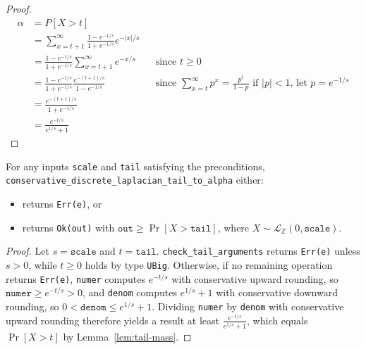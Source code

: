 \documentclass{article}
\begin{document}
\begin{proof}
    \begin{align*}
        \alpha &= P[X > t] \\
        &= \sum_{x=t + 1}^{\infty} \frac{1 - e^{-1/s}}{1 + e^{-1/s}} e^{-|x|/s} \\
        &= \frac{1 - e^{-1/s}}{1 + e^{-1/s}} \sum_{x=t + 1}^{\infty} e^{-x/s}
            && \text{since } t \ge 0 \\
        &= \frac{1 - e^{-1/s}}{1 + e^{-1/s}} \frac{e^{-(t + 1)/s}}{1 - e^{-1/s}}
            && \text{since } \sum_{x=t}^\infty p^x = \frac{p^t}{1 - p} \text{ if } |p| < 1 \text{, let } p = e^{-1/s}\\
        &= \frac{e^{-(t + 1)/s}}{1 + e^{-1/s}} \\
        &= \frac{e^{-t/s}}{e^{1/s} + 1}
    \end{align*}

\end{proof}

\begin{theorem}\label{thm:postcondition}
    For any inputs \texttt{scale} and \texttt{tail} satisfying the preconditions, \\
    \texttt{conservative\_discrete\_laplacian\_tail\_to\_alpha} either:
    \begin{itemize}
        \item returns \texttt{Err(e)}, or
        \item returns \texttt{Ok(out)} with $\texttt{out} \ge \Pr[X > \texttt{tail}]$, where $X \sim \mathcal{L}_\mathbb{Z}(0, \texttt{scale})$.
    \end{itemize}
\end{theorem}

\begin{proof}
    Let $s = \texttt{scale}$ and $t = \texttt{tail}$.
    \texttt{check\_tail\_arguments} returns \texttt{Err(e)} unless $s > 0$, while $t \ge 0$ holds by type \texttt{UBig}.
    Otherwise, if no remaining operation returns \texttt{Err(e)}, \texttt{numer} computes $e^{-t/s}$ with conservative upward rounding, so $\texttt{numer} \ge e^{-t/s} > 0$, and \texttt{denom} computes $e^{1/s} + 1$ with conservative downward rounding, so $0 < \texttt{denom} \le e^{1/s} + 1$.
    Dividing \texttt{numer} by \texttt{denom} with conservative upward rounding therefore yields a result at least $\frac{e^{-t/s}}{e^{1/s} + 1}$, which equals $\Pr[X > t]$ by Lemma~\ref{lem:tail-mass}.
\end{proof}
\end{document}

